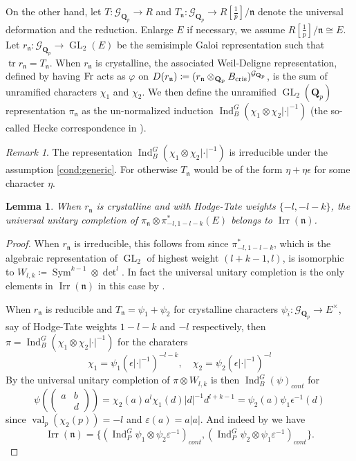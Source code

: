\documentclass[leqno]{amsart}
\newcommand{\Gp}{\mathcal{G}_{\Qp}} %
\newcommand{\Fr}{\textnormal{Fr}} %
\newcommand{\cris}{\textnormal{cris}}
\DeclareMathOperator{\Irr}{Irr}
\DeclareMathOperator{\GL}{GL}
\DeclareMathOperator{\mtr}{tr}
\DeclareMathOperator{\Sym}{Sym}
\newcommand{\Qp}{\mathbf{Q}_p}
\DeclareMathOperator{\val}{val}
\newcommand{\fn}{\mathfrak{n}}
\DeclareMathOperator{\Ind}{Ind}
\newtheorem{lem}[thm]{Lemma}
\theoremstyle{definition}
\theoremstyle{remark}
\newtheorem{rem}[thm]{Remark}
\begin{document}
On the other hand,
let $T\colon \Gp\to R$ 
and $T_\fn\colon \Gp\to R[\frac{1}{p}]/\fn$ 
denote the universal deformation and 
the reduction.
Enlarge $E$ if necessary,
we assume $R[\frac{1}{p}]/\fn\cong E$.
Let $r_{\fn}\colon \Gp\to \GL_2(E)$
be the semisimple Galoi representation
such that $\mtr r_{\fn}=T_{\fn}$.
When $r_\fn$ is crystalline,
the associated Weil-Deligne representation,
defined by having $\Fr$ acts as $\varphi$
on  $D(r_\fn)\coloneqq (r_\fn\otimes_{\Qp}B_{\cris})^{\Gp}$,
is the sum of 
unramified characters $\chi_1$ and  $\chi_2$.
We then define the unramified
$\GL_2(\Qp)$ representation
$\pi_\fn$
as the un-normalized induction
$\Ind_B^G(\chi_1\otimes\chi_2|\cdot|^{-1})$
(the so-called Hecke correspondence in \cite{pan}).

\begin{rem}
	The representation 
	$\Ind_B^G(\chi_1\otimes\chi_2|\cdot|^{-1})$
	is irreducible under the assumption \eqref{cond:generic}.
	For otherwise
	$T_\fn$ would be of the form
	$\eta+\eta\epsilon$ for some character  $\eta$.
\end{rem}

\begin{lem}\label{lem:uni_completion}
	When $r_\fn$ is crystalline 
	and with 
	Hodge-Tate weights $\{-l,-l-k\}$,
	the universal unitary completion of 
	$\pi_\fn\otimes \pi_{-l,1-l-k}^*(E)$ belongs to 
	$\Irr(\fn)$.
\end{lem}
\begin{proof}
	When  $r_\fn$ is irreducible,
	this follows from \cite[Thm. 1.3]{CDP}
	since 
	$\pi_{-l,1-l-k}^*$,
	which is the algebraic representation of $\GL_2$
	of highest weight  $(l+k-1,l)$,
	is isomorphic to 
	$W_{l,k}\coloneqq \Sym^{k-1}\otimes\det^l$.
	In fact the universal unitary completion
	is the only elements in $\Irr(\fn)$
	in this case by \cite[Cor 8.14]{pask}.
	
	When  $r_\fn$ is reducible
	and $T_\fn=\psi_1+\psi_2$
	for crystalline characters
	$\psi_i\colon \Gp\to E^\times$,
	say of Hodge-Tate weights
	$1-l-k$ and  $-l$ respectively,
	then $\pi=\Ind_B^G(\chi_1\otimes\chi_2|\cdot|^{-1})$
	for the charaters
	\[
	\chi_1=\psi_1(\epsilon|\cdot|^{-1})^{-l-k},\quad
	\chi_2=\psi_2(\epsilon|\cdot|^{-1})^{-l}	
	\]
	By \cite[Thm 12.3]{pask} the universal unitary completion
	of $\pi\otimes W_{l,k}$
	is then $\Ind_B^G(\psi)_{cont}$ for
	\[
		\psi( (\begin{smallmatrix}
			a&b\\&d
		\end{smallmatrix}))
		=\chi_2(a)a^l\chi_1(d)|d|^{-1}d^{l+k-1}
		=\psi_2(a)\psi_1\epsilon^{-1}(d)
	\]
	since $\val_p(\chi_2(p))=-l$ and $\varepsilon(a)=a|a|$.
	And indeed by \cite[Cor 8.15]{pask} we have
	\[
	\Irr(\fn)=\{(\Ind_P^G\psi_1\otimes\psi_2\varepsilon^{-1})_{cont},
	(\Ind_P^G\psi_2\otimes\psi_1\varepsilon^{-1})_{cont}\}.
	\]
\end{proof}
\end{document}
